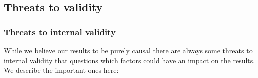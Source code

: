 
\subsection{Threats to validity}


\subsubsection{Threats to internal validity} \mbox{}\par

While we believe our results to be purely causal there are always some threats to internal validity that questions which factors could have an impact on the results. We describe the important ones here:

